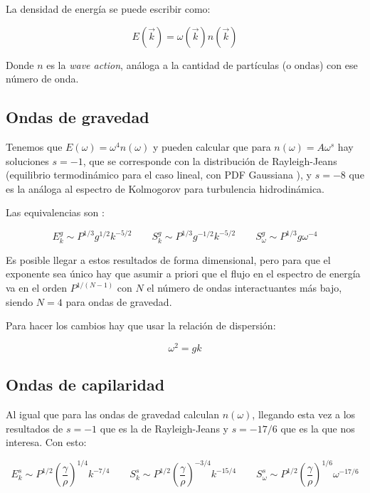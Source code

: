 La densidad de energía se puede escribir como:

\begin{equation}
	E(\vec k) = \omega(\vec k) n(\vec k)
\end{equation}  

Donde $n$ es la \textit{wave action}, análoga a la cantidad de partículas (o ondas) con ese número de onda.

\subsection*{Ondas de gravedad \cite{zakharovEnergySpectrumStochastic1967}}
Tenemos que $E(\omega)=\omega^4n(\omega)$ y pueden calcular que para $n(\omega)=A\omega^s$ hay soluciones $s=-1$, que se corresponde con la distribución de Rayleigh-Jeans (equilibrio termodinámico para el caso lineal, con PDF Gaussiana \cite{nazarenkoWaveTurbulence2011}), y $s=-8$ que es la análoga al espectro de Kolmogorov para turbulencia hidrodinámica.

Las equivalencias son \cite{falconExperimentsSurfaceGravity2022}:

\begin{equation}
	E_k^g \sim P^{1/3} g^{1/2} k^{-5/2} \qquad S_k^g \sim P^{1/3} g^{-1/2} k^{-5/2} \qquad S_\omega^g  \sim P^{1/3} g \omega^{-4}
\end{equation}  

Es posible llegar a estos resultados de forma dimensional, pero para que el exponente sea único hay que asumir a priori que el flujo en el espectro de energía va en el orden $P^{1/(N-1)}$ con $N$ el número de ondas interactuantes más bajo, siendo $N=4$ para ondas de gravedad.

Para hacer los cambios hay que usar la relación de dispersión:

\begin{equation}
	\omega^2=gk
\end{equation}

\subsection*{Ondas de capilaridad \cite{zakharovWeakTurbulenceCapillary1971}}
Al igual que para las ondas de gravedad calculan $n(\omega)$, llegando esta vez a los resultados de $s=-1$ que es la de Rayleigh-Jeans y $s=-17/6$ que es la que nos interesa. Con esto:

\begin{equation}
	E_k^s \sim P^{1/2} \left(\frac{\gamma}{\rho}\right)^{1/4} k^{-7/4} \qquad S_k^s \sim P^{1/2} \left(\frac{\gamma}{\rho}\right)^{-3/4} k^{-15/4} \qquad S_\omega^s  \sim P^{1/2} \left(\frac{\gamma}{\rho}\right)^{1/6} \omega^{-17/6}
\end{equation}   

